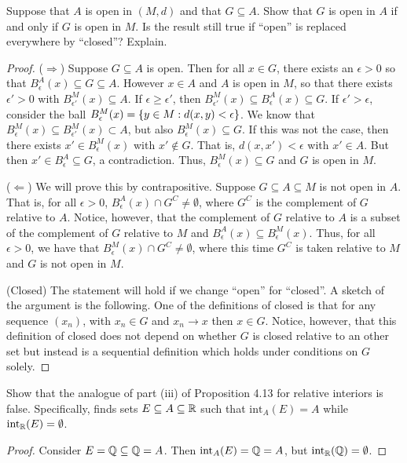 \begin{exercise}{62}
Suppose that $A$ is open in $(M,d)$ and that $G\subseteq A$. Show that $G$ is open in $A$ if and only if $G$ is open in $M$. Is the result still true if ``open'' is replaced everywhere by ``closed''? Explain.
\end{exercise}
\begin{proof}
($\Rightarrow$)
Suppose $G\subseteq A$ is open.
Then for all $x\in G$, there exists an $\epsilon>0$ so that $B_\epsilon^A(x) \subseteq G \subseteq A$.
However $x\in A$ and $A$ is open in $M$, so that there exists $\epsilon'>0$ with $B_{\epsilon'}^M(x)\subseteq A$.
If $\epsilon\geq\epsilon'$, then $B_{\epsilon'}^M(x)\subseteq B^A_\epsilon(x)\subseteq G$.
If $\epsilon'>\epsilon$, consider the ball $B_\epsilon^M(x)=\{y\in M:d(x,y)<\epsilon\}$.
We know that $B_\epsilon^M(x)\subseteq B_{\epsilon'}^M(x)\subset A$, but also $B_\epsilon^M(x)\subseteq G$.
If this was not the case, then there exists $x'\in B_\epsilon^M(x)$ with $x'\notin G$.
That is, $d(x,x')<\epsilon$ with $x'\in A$.
But then $x'\in B_\epsilon^A \subseteq G$, a contradiction.
Thus, $B_\epsilon^M(x)\subseteq G$ and $G$ is open in $M$.

($\Leftarrow$)
We will prove this by contrapositive.
Suppose $G\subseteq A\subseteq M$ is not open in $A$.
That is, for all $\epsilon>0$, $B^A_\epsilon(x)\cap G^C\neq \emptyset$, where $G^C$ is the complement of $G$ relative to $A$.
Notice, however, that the complement of $G$ relative to $A$ is a subset of the complement of $G$ relative to $M$ and $B^A_\epsilon(x)\subseteq B^M_\epsilon(x)$.
Thus, for all $\epsilon>0$, we have that $B^M_\epsilon(x)\cap G^C\neq \emptyset$, where this time $G^C$ is taken relative to $M$ and $G$ is not open in $M$.

(Closed)
The statement will hold if we change ``open'' for ``closed''.
A sketch of the argument is the following.
One of the definitions of closed is that for any sequence $(x_n)$, with $x_n\in G$ and $x_n\to x$ then $x\in G$.
Notice, however, that this definition of closed does not depend on whether $G$ is closed relative to an other set but instead is a sequential definition which holds under conditions on $G$ solely.
\end{proof} 

\begin{exercise}{64}
Show that the analogue of part (iii) of Proposition 4.13  for relative interiors is false. 
Specifically, finds sets $E \subseteq A \subseteq\mathbb{R}$ such that $\text{int}_A(E)=A$ while $\text{int}_{\mathbb{R}}(E)=\emptyset$.
\end{exercise}
\begin{proof}
Consider $E=\mathbb{Q}\subseteq\mathbb{Q} =A$.
Then $\text{int}_A(E)=\mathbb{Q}=A$, but $\text{int}_{\mathbb{R}}(\mathbb{Q})=\emptyset$.
\end{proof} 
